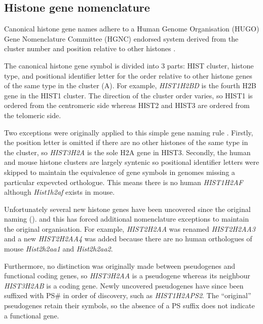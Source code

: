 
  \subsection{Histone gene nomenclature}
    Canonical histone gene names adhere to a Human Genome Organisation (HUGO) Gene Nomenclature Committee (HGNC) 
	endorsed system derived from the cluster number and position relative to other histones \citep{Marzluff02}.

	The canonical histone gene symbol is divided into 3 parts: 
	HIST cluster, histone type, and positional identifier letter
	for the order relative to other histone genes of the same type in the cluster (A).
	For example, \textit{HIST1H2BD} is the fourth H2B gene in the HIST1 cluster.
	The direction of the cluster order varies, so HIST1 is ordered from the centromeric side 
	whereas HIST2 and HIST3 are ordered from the telomeric side.
	
    Two exceptions were originally applied to this simple gene naming rule \citep{Marzluff02}. 
	Firstly, the position letter is omitted if there are no other histones of the same type in the cluster, 
	so \textit{HIST3H2A} is the sole H2A gene in HIST3. 
	Secondly, the human and mouse histone clusters are largely syntenic 
	so positional identifier letters were skipped to maintain the equivalence of gene symbols 
	in genomes missing a particular expevcted orthologue.
	This means there is no human \textit{HIST1H2AF} although \textit{Hist1h2af} exists in mouse.

	Unfortunately several new histone genes have been uncovered since the original naming (). 
	and this has forced additional nomenclature exceptions to maintain the original organisation.
	For example, \textit{HIST2H2AA} was renamed \textit{HIST2H2AA3} and a new \textit{HIST2H2AA4} was added
	because there are no human orthologues of mouse \textit{Hist2h2aa1} and \textit{Hist2h2aa2}.
	
	Furthermore, no distinction was originally made between pseudogenes and functional coding genes, 
	so \textit{HIST3H2AA} is a pseudogene whereas its neighbour \textit{HIST3H2AB} is a coding gene.
	Newly uncovered pseudogenes have since been suffixed with PS\# in order of discovery, such as \textit{HIST1H2APS2}. 
	The ``original'' pseudogenes retain their symbols, so the absence of a PS suffix does not indicate a functional gene.

